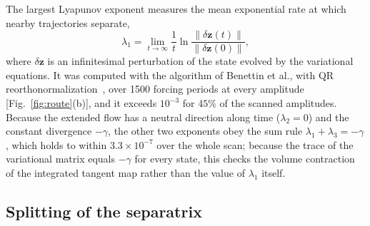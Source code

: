 The largest Lyapunov exponent measures the mean exponential rate at which nearby trajectories separate,
\begin{equation}
\lambda_1 = \lim_{t\to\infty}\frac1t\ln\frac{\|\delta\mathbf z(t)\|}{\|\delta\mathbf z(0)\|},
\label{eq:lyapunov}
\end{equation}
where $\delta\mathbf z$ is an infinitesimal perturbation of the state evolved by the variational equations. It was computed with the algorithm of Benettin et al., with QR reorthonormalization~\cite{Benettin1980,Benettin1980b}, over 1500 forcing periods at every amplitude [Fig.~\ref{fig:route}(b)], and it exceeds $10^{-3}$ for $45\%$ of the scanned amplitudes. Because the extended flow has a neutral direction along time ($\lambda_2=0$) and the constant divergence $-\gamma$, the other two exponents obey the sum rule $\lambda_1+\lambda_3=-\gamma$, which holds to within $3.3\times10^{-7}$ over the whole scan; because the trace of the variational matrix equals $-\gamma$ for every state, this checks the volume contraction of the integrated tangent map rather than the value of $\lambda_1$ itself.

\subsection{Splitting of the separatrix}\label{sec:melnikov}

